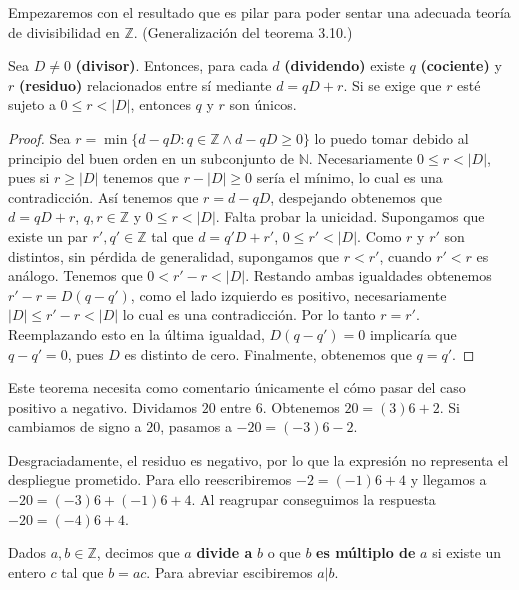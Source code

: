 \documentclass[main.tex]{subfiles}
\begin{document}
Empezaremos con el resultado que es pilar para poder sentar una adecuada teor\'ia de divisibilidad en $\mathbb Z$. (Generalizaci\'on del teorema 3.10.)

\begin{theorem}
    Sea $D \not= 0$ {\bf (divisor)}. Entonces, para cada $d$ {\bf (dividendo)} existe $q$ {\bf (cociente)} y $r$ {\bf (residuo)} relacionados entre s\'i mediante $d = qD + r$. Si se exige que $r$ est\'e sujeto a $0 \leq r < |D|$, entonces $q$ y $r$ son \'unicos.
\end{theorem}

\begin{proof}
    Sea $r = \min \{d - qD : q \in \mathbb Z \land d - qD \geq 0\}$
    lo puedo tomar debido al principio del buen orden en un subconjunto de $\mathbb N$. Necesariamente $0 \leq r < |D|$, pues si $r \geq |D|$ tenemos que $r - |D| \geq 0$ ser\'ia el m\'inimo, lo cual es una contradicci\'on. As\'i tenemos que $r = d - qD$, despejando obtenemos que $d = qD + r$, $q, r \in \mathbb Z$ y $0 \leq r < |D|$. Falta probar la unicidad. Supongamos que existe un par $r', q' \in \mathbb Z$ tal que $d = q'D + r'$, $0 \leq r' < |D|$. Como $r$ y $r'$ son distintos, sin p\'erdida de generalidad, supongamos que $r < r'$, cuando $r' < r$ es an\'alogo. Tenemos que $0 < r' - r < |D|$. Restando ambas igualdades obtenemos $r' - r = D(q - q')$, como el lado izquierdo es positivo, necesariamente $|D| \leq r' - r < |D|$ lo cual es una contradicci\'on. Por lo tanto $r = r'$. Reemplazando esto en la \'ultima igualdad, $D(q - q') = 0$ implicar\'ia que $q - q' = 0$, pues $D$ es distinto de cero. Finalmente, obtenemos que $q = q'$.
\end{proof}

\begin{example}
    Este teorema necesita como comentario \'unicamente el c\'omo pasar del caso positivo a negativo. Dividamos $20$ entre $6$. Obtenemos $20 = (3)6 + 2$. Si cambiamos de signo a $20$, pasamos a $-20 = (-3)6 - 2$.
    
    Desgraciadamente, el residuo es negativo, por lo que la expresi\'on no representa el despliegue prometido. Para ello reescribiremos $-2 = (-1)6 + 4$ y llegamos a $-20 = (-3)6 + (-1)6 + 4$. Al reagrupar conseguimos la respuesta $-20 = (-4)6 + 4$.
\end{example}

\begin{defn}
    Dados $a, b \in \mathbb Z$, decimos que $a$ {\bf divide a} $b$ o que $b$ {\bf es m\'ultiplo de} $a$ si existe un entero $c$ tal que $b = ac$. Para abreviar escibiremos $a | b$.
\end{defn}
\end{document}
